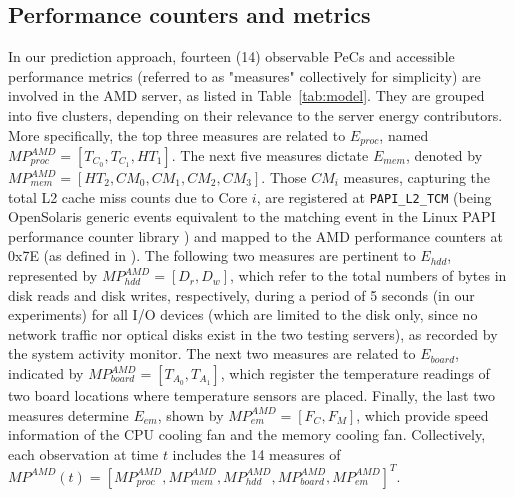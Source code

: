 \documentclass[prodmode,acmtaco,pdftex]{acmsmall}
\begin{document}
\subsection{Performance counters and metrics}
\label{sec:variables}
In our prediction approach, fourteen (14) observable PeCs and accessible
performance metrics (referred to as "measures" collectively for simplicity)
are involved in the AMD server, as listed in Table~\ref{tab:model}.
They are grouped into five clusters, depending on their relevance to the
server energy contributors.  More specifically, the top three measures
are related to $E_{proc}$, named $MP_{proc}^{AMD} = \left[T_{C_{0}},
  T_{C_{1}}, HT_{1}\right]$.  The next five measures dictate $E_{mem}$,
denoted by $MP_{mem}^{AMD} = \left[HT_{2}, CM_{0}, CM_{1}, CM_{2},
  CM_{3}\right]$.  Those $CM_i$ measures, capturing the total L2 cache
miss counts due to Core $i$, are registered at \texttt{PAPI\_L2\_TCM} (being
OpenSolaris generic events equivalent to the matching event in the Linux
PAPI performance counter library \cite{London2001}) and mapped to the
AMD performance counters at 0x7E (as defined in \cite{AMD2008}).  The
following two measures are pertinent to $E_{hdd}$, represented by
$MP_{hdd}^{AMD} = \left[D_{r}, D_{w}\right]$, which refer to the total
numbers of bytes in disk reads and disk writes, respectively, during a
period of 5 seconds (in our experiments) for all I/O devices (which are
limited to the disk only, since no network traffic nor optical disks
exist in the two testing servers), as recorded by the system activity
monitor.  The next two measures are related to $E_{board}$, indicated by
$MP_{board}^{AMD} = \left[T_{A_0}, T_{A_1}\right]$, which register the
temperature readings of two board locations where temperature sensors
are placed.  Finally, the last two measures determine $E_{em}$, shown by
$MP_{em}^{AMD} = \left[F_C, F_M\right]$, which provide speed information
of the CPU cooling fan and the memory cooling fan.  Collectively, each
observation at time $t$ includes the 14 measures of $MP^{AMD}(t) =
\left[MP_{proc}^{AMD}, MP_{mem}^{AMD}, MP_{hdd}^{AMD},
  MP_{board}^{AMD},MP_{em}^{AMD}\right]^{T}$.
\end{document}
